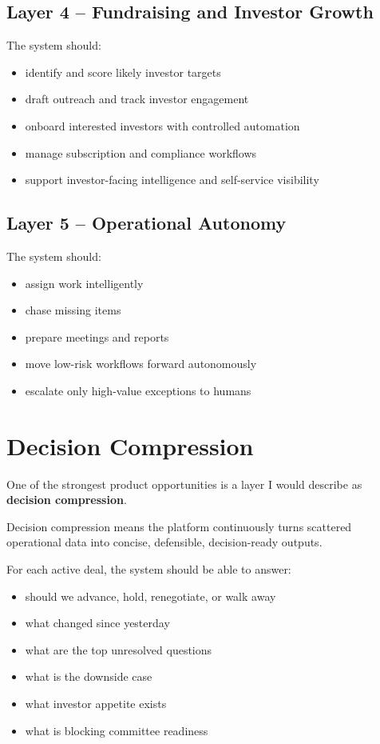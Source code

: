 \documentclass[11pt]{article}
\begin{document}
\subsection{Layer 4 -- Fundraising and Investor Growth}

The system should:

\begin{itemize}
\item identify and score likely investor targets
\item draft outreach and track investor engagement
\item onboard interested investors with controlled automation
\item manage subscription and compliance workflows
\item support investor-facing intelligence and self-service visibility
\end{itemize}

\subsection{Layer 5 -- Operational Autonomy}

The system should:

\begin{itemize}
\item assign work intelligently
\item chase missing items
\item prepare meetings and reports
\item move low-risk workflows forward autonomously
\item escalate only high-value exceptions to humans
\end{itemize}

\section{Decision Compression}

One of the strongest product opportunities is a layer I would describe as \textbf{decision compression}.

Decision compression means the platform continuously turns scattered operational data into concise, defensible, decision-ready outputs.

For each active deal, the system should be able to answer:

\begin{itemize}
\item should we advance, hold, renegotiate, or walk away
\item what changed since yesterday
\item what are the top unresolved questions
\item what is the downside case
\item what investor appetite exists
\item what is blocking committee readiness
\end{itemize}
\end{document}
